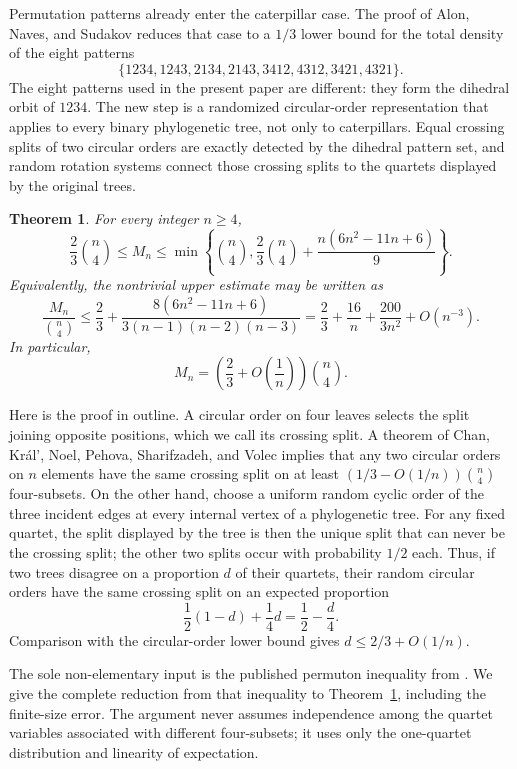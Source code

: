 \documentclass[a4paper]{amsart}
\newtheorem{theorem}{Theorem}[section]
\theoremstyle{remark}
\begin{document}
Permutation patterns already enter the caterpillar case. The proof of
Alon, Naves, and Sudakov reduces that case to a $1/3$ lower bound for
the total density of the eight patterns
\[
 \{1234,1243,2134,2143,3412,4312,3421,4321\}.
\]
The eight patterns used in the present paper are different: they form
the dihedral orbit of $1234$. The new step is a randomized
circular-order representation that applies to every binary
phylogenetic tree, not only to caterpillars. Equal crossing splits of
two circular orders are exactly detected by the dihedral pattern set,
and random rotation systems connect those crossing splits to the
quartets displayed by the original trees.

\begin{theorem}\label{thm:main}
For every integer $n\ge4$,
\[
 \frac23\binom n4
 \le M_n
 \le \min\left\{\binom n4,
 \frac23\binom n4+\frac{n(6n^2-11n+6)}9\right\}.
\]
Equivalently, the nontrivial upper estimate may be written as
\[
 \frac{M_n}{\binom n4}
 \le
 \frac23+
 \frac{8(6n^2-11n+6)}{3(n-1)(n-2)(n-3)}
 =
 \frac23+\frac{16}{n}+\frac{200}{3n^2}+O(n^{-3}).
\]
In particular,
\[
 M_n=\left(\frac23+O\left(\frac1n\right)\right)\binom n4.
\]
\end{theorem}

Here is the proof in outline. A circular order on four leaves selects
the split joining opposite positions, which we call its crossing
split. A theorem of Chan, Kr\'al', Noel, Pehova, Sharifzadeh, and
Volec implies that any two circular orders on $n$ elements have the
same crossing split on at least
$(1/3-O(1/n))\binom n4$ four-subsets. On the other hand, choose a
uniform random cyclic order of the three incident edges at every
internal vertex of a phylogenetic tree. For any fixed quartet, the
split displayed by the tree is then the unique split that can never be
the crossing split; the other two splits occur with probability
$1/2$ each. Thus, if two trees disagree on a proportion $d$ of their
quartets, their random circular orders have the same crossing split on
an expected proportion
\[
 \frac12(1-d)+\frac14d=\frac12-\frac d4.
\]
Comparison with the circular-order lower bound gives
$d\le2/3+O(1/n)$.

The sole non-elementary input is the published permuton inequality
from \cite[Theorem~7]{ChanEtAl}. We give the complete reduction from
that inequality to Theorem~\ref{thm:main}, including the finite-size
error. The argument never assumes independence among the quartet
variables associated with different four-subsets; it uses only the
one-quartet distribution and linearity of expectation.
\end{document}

